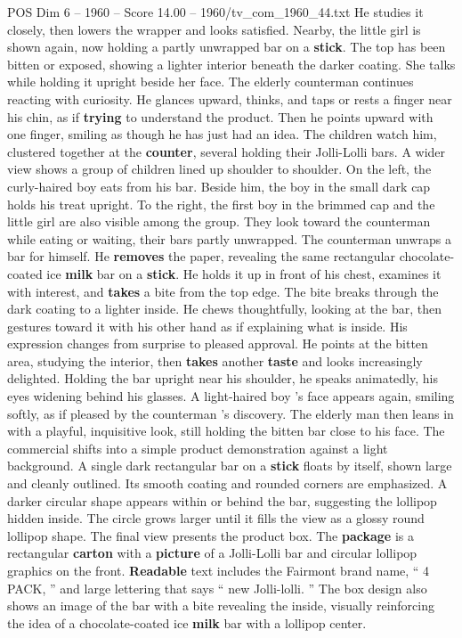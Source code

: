 \begin{textsample}{POS Dim 6 – 1960 – Score 14.00 – 1960/tv\_com\_1960\_44.txt}
He studies it closely, then lowers the wrapper and looks satisfied.
Nearby, the little girl is shown again, now holding a partly unwrapped bar on a \textbf{stick}.
The top has been bitten or exposed, showing a lighter interior beneath the darker coating.
She talks while holding it upright beside her face.
The elderly counterman continues reacting with curiosity.
He glances upward, thinks, and taps or rests a finger near his chin, as if \textbf{trying} to understand the product.
Then he points upward with one finger, smiling as though he has just had an idea.
The children watch him, clustered together at the \textbf{counter}, several holding their Jolli-Lolli bars.
A wider view shows a group of children lined up shoulder to shoulder.
On the left, the curly-haired boy eats from his bar.
Beside him, the boy in the small dark cap holds his treat upright.
To the right, the first boy in the brimmed cap and the little girl are also visible among the group.
They look toward the counterman while eating or waiting, their bars partly unwrapped.
The counterman unwraps a bar for himself.
He \textbf{removes} the paper, revealing the same rectangular chocolate-coated ice \textbf{milk} bar on a \textbf{stick}.
He holds it up in front of his chest, examines it with interest, and \textbf{takes} a bite from the top edge.
The bite breaks through the dark coating to a lighter inside.
He chews thoughtfully, looking at the bar, then gestures toward it with his other hand as if explaining what is inside.
His expression changes from surprise to pleased approval.
He points at the bitten area, studying the interior, then \textbf{takes} another \textbf{taste} and looks increasingly delighted.
Holding the bar upright near his shoulder, he speaks animatedly, his eyes widening behind his glasses.
A light-haired boy ’s face appears again, smiling softly, as if pleased by the counterman ’s discovery.
The elderly man then leans in with a playful, inquisitive look, still holding the bitten bar close to his face.
The commercial shifts into a simple product demonstration against a light background.
A single dark rectangular bar on a \textbf{stick} floats by itself, shown large and cleanly outlined.
Its smooth coating and rounded corners are emphasized.
A darker circular shape appears within or behind the bar, suggesting the lollipop hidden inside.
The circle grows larger until it fills the view as a glossy round lollipop shape.
The final view presents the product box.
The \textbf{package} is a rectangular \textbf{carton} with a \textbf{picture} of a Jolli-Lolli bar and circular lollipop graphics on the front. \textbf{Readable} text includes the Fairmont brand name, “ 4 PACK, ” and large lettering that says “ new Jolli-lolli. ” The box design also shows an image of the bar with a bite revealing the inside, visually reinforcing the idea of a chocolate-coated ice \textbf{milk} bar with a lollipop center.

\end{textsample}
